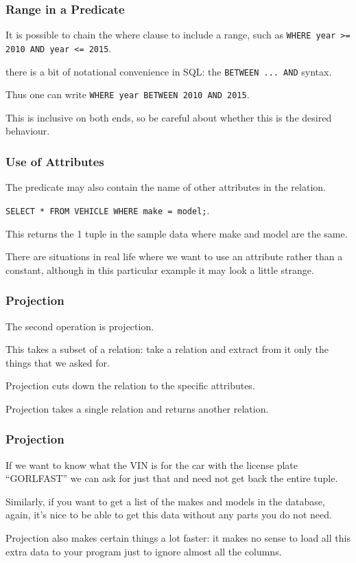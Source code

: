 \begin{frame}
\frametitle{Range in a Predicate}

It is possible to chain the where clause to include a range, such as \texttt{WHERE year >= 2010 AND year <= 2015}.

there is a bit of notational convenience in SQL: the \texttt{BETWEEN ... AND} syntax. 

Thus one can write \texttt{WHERE year BETWEEN 2010 AND 2015}. 

This is inclusive on both ends, so be careful about whether this is the desired behaviour. 

\end{frame}



\begin{frame}
\frametitle{Use of Attributes}

The predicate may also contain the name of other attributes in the relation.

\texttt{SELECT * FROM VEHICLE WHERE make = model;}. 

This returns the 1 tuple in the sample data where make and model are the same. 

There are situations in real life where we want to use an attribute rather than a constant, although in this particular example it may look a little strange.

\end{frame}



\begin{frame}
\frametitle{Projection}

The second operation is \alert{projection}. 

This takes a subset of a relation: take a relation and extract from it only the things that we asked for. 

Projection cuts down the relation to the specific attributes. 

Projection takes a single relation and returns another relation.


\end{frame}



\begin{frame}
\frametitle{Projection}

If we want to know what the VIN is for the car with the license plate ``GORLFAST'' we can ask for just that and need not get back the entire tuple. 

Similarly, if you want to get a list of the makes and models in the database, again, it's nice to be able to get this data without any parts you do not need. 

Projection also makes certain things a lot faster: it makes no sense to load all this extra data to your program just to ignore almost all the columns.

\end{frame}



